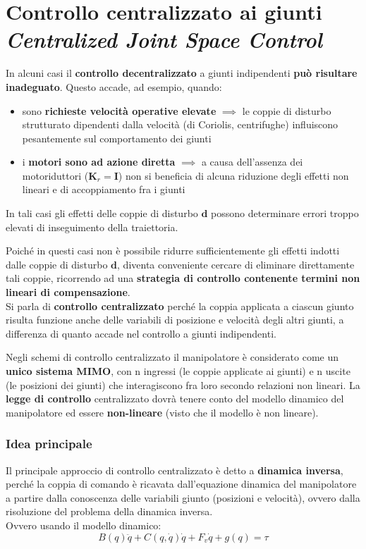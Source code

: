 \section[Controllo centralizzato ai giunti]{Controllo centralizzato ai giunti \\ \small \textit{Centralized Joint Space Control}}

In alcuni casi il \textbf{controllo decentralizzato} a giunti indipendenti \textbf{può risultare inadeguato}. Questo accade, ad esempio, quando:
\begin{itemize}
	\item sono \textbf{richieste velocità operative elevate} $\implies$ le coppie di disturbo strutturato dipendenti dalla velocità (di Coriolis, centrifughe) influiscono pesantemente sul comportamento dei giunti
	\item i \textbf{motori sono ad azione diretta} $\implies$ a causa dell’assenza dei motoriduttori ($\mathbf{K}_r = \mathbf{I}$) non si beneficia di alcuna riduzione degli effetti non lineari e di accoppiamento fra i giunti
\end{itemize}
 
In tali casi gli effetti delle coppie di disturbo $\mathbf{d}$ possono determinare errori troppo elevati di inseguimento della traiettoria.
 
Poiché in questi casi non è possibile ridurre sufficientemente gli effetti indotti dalle coppie di disturbo $\mathbf{d}$, diventa conveniente cercare di eliminare direttamente tali coppie, ricorrendo ad una \textbf{strategia di controllo contenente termini non lineari di compensazione}.\\
Si parla di \textbf{controllo centralizzato} perché la coppia applicata a ciascun giunto risulta funzione anche delle variabili di posizione e velocità degli altri giunti, a differenza di quanto accade nel controllo a giunti indipendenti.
 
Negli schemi di controllo centralizzato il manipolatore è considerato come un \textbf{unico sistema MIMO}, con n ingressi (le coppie applicate ai giunti) e n uscite (le posizioni dei giunti) che interagiscono fra loro secondo relazioni non lineari. La \textbf{legge di controllo} centralizzato dovrà tenere conto del modello dinamico del manipolatore ed essere \textbf{non-lineare} (visto che il modello è non lineare).
 
 
 
\subsubsection{Idea principale}
Il principale approccio di controllo centralizzato è detto a \textbf{dinamica inversa}, perché la coppia di comando è ricavata dall’equazione dinamica del manipolatore a partire dalla conoscenza delle variabili giunto (posizioni e velocità), ovvero dalla risoluzione del problema della dinamica inversa.\\
Ovvero usando il modello dinamico:
\boldmath
$$
B(q)\ddot{q} + C(q, \dot{q})\dot{q} + F_v\dot{q} + g(q) = \tau
$$
\unboldmath


